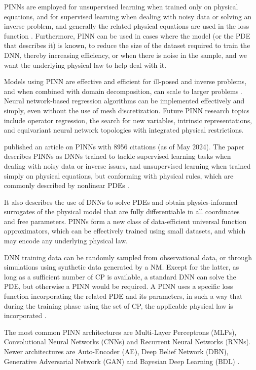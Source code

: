 PINNs are employed for unsupervised learning when trained only on physical equations, and for supervised learning when dealing with noisy data or solving an inverse problem, and generally the related physical equations are used in the loss function \cite{Cuomo2022}. Furthermore, PINN can be used in cases where the model (or the PDE that describes it) is known, to reduce the size of the dataset required to train the DNN, thereby increasing efficiency, or when there is noise in the sample, and we want the underlying physical law to help deal with it.

Models using PINN are effective and efficient for ill-posed and inverse problems, and when combined with domain decomposition, can scale to larger problems \cite{Sharma2023a}. Neural network-based regression algorithms can be implemented effectively and simply, even without the use of mesh discretization. Future PINN research topics include operator regression, the search for new variables, intrinsic representations, and equivariant neural network topologies with integrated physical restrictions. 

 published an article on PINNs with 8956 citations (as of May 2024). The paper describes PINNs as DNNs trained to tackle supervised learning tasks when dealing with noisy data or inverse issues, and unsupervised learning when trained simply on physical equations, but conforming with physical rules, which are commonly described by nonlinear PDEs \cite{Cuomo2022}.

It also describes the use of DNNs to solve PDEs and obtain physics-informed surrogates of the physical model that are fully differentiable in all coordinates and free parameters. PINNs form a new class of data-efficient universal function approximators, which can be effectively trained using small datasets, and which may encode any underlying physical law. 

DNN training data can be randomly sampled from observational data, or through simulations using synthetic data generated by a NM. Except for the latter, as long as a sufficient number of CP is available, a standard DNN can solve the PDE, but otherwise a PINN would be required. A PINN uses a specific loss function incorporating the related PDE and its parameters, in such a way that during the training phase using the set of CP, the applicable physical law is incorporated \cite{Cuomo2022}.

The most common PINN architectures are Multi-Layer Perceptrons (MLPs), Convolutional Neural Networks (CNNs) and Recurrent Neural Networks (RNNs). Newer architectures are Auto-Encoder (AE), Deep Belief Network (DBN), Generative Adversarial Network (GAN) and Bayesian Deep Learning (BDL) \cite{Vladimirova2018}.

